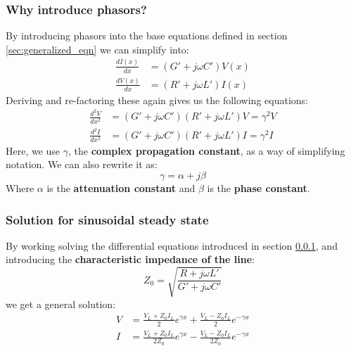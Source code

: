 \documentclass[../transmission.tex]{subfiles}
\begin{document}
			\subsubsection{Why introduce phasors?}
				\label{sec:why_phasors}
				By introducing phasors into the base equations defined in section \ref{sec:generalized_eqn} we can simplify into:
				\begin{align}
					\frac{dI(x)}{dx}&=(G'+j\omega C')V(x)\\
					\frac{dV(x)}{dx}&=(R'+j\omega L')I(x)
				\end{align}
				Deriving and re-factoring these again gives us the following equations:
				\begin{align}
					\frac{d^2V}{dx^2}&=(G'+j\omega C')(R'+j\omega L')V =\gamma^2V\\
					\frac{d^2I}{dx^2}&=(G'+j\omega C')(R'+j\omega L')I = \gamma^2I
				\end{align}
				Here, we use $\gamma$, the \textbf{complex propagation constant}, as a way of simplifying notation. We can also rewrite it as:
				\begin{equation}
					\gamma = \alpha +j\beta
				\end{equation}
				Where $\alpha$ is the \textbf{attenuation constant} and $\beta$ is the \textbf{phase constant}.
			
			\subsubsection{Solution for sinusoidal steady state}
				By working solving the differential equations introduced in section \ref{sec:why_phasors}, and introducing the \textbf{characteristic impedance of the line}:
				\begin{equation}
					Z_0 = \sqrt{\frac{R+j\omega L'}{G'+j\omega C'}}
				\end{equation}
				we get a general solution:
				\begin{align}
					\label{eq:simple_voltage}
					V&=\frac{V_L+Z_0I_L}{2}e^{\gamma x}+\frac{V_L-Z_0I_L}{2}e^{-\gamma x}\\
					\label{eq:simple_current}
					I&=\frac{V_L+Z_0I_L}{2Z_0}e^{\gamma x}-\frac{V_L-Z_0I_L}{2Z_0}e^{-\gamma x}
				\end{align}
\end{document}
